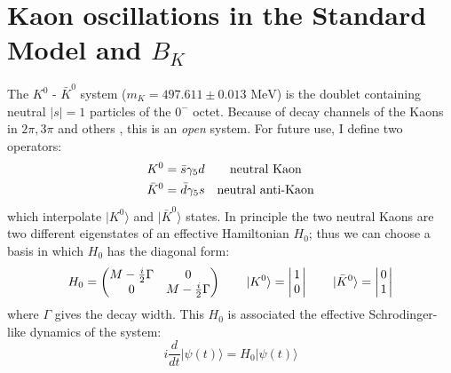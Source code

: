 \documentclass[english, LaM, oneside, noexaminfo]{sapthesis}
\newcommand{\kkb}{$K^0$ - $\bar K^0$ }
\newcommand{\ra}{\rangle}
\newcommand{\mev}{\text{ MeV}}
\begin{document}
\section{Kaon oscillations in the Standard Model and $B_K$}
\noindent
The \kkb system ($m_K = 497.611 \pm 0.013 \mev$) is the doublet containing neutral $|s| = 1$ particles of the $0^-$ octet.
Because of decay channels of the Kaons in $2\pi, 3\pi$ and others \cite{ParticleDataGroup}, this is an \textit{open} system.
For future use, I define two operators:
\begin{equation}\label{eq:kkbar-operators}
    \begin{aligned}
        & K^0 = \bar s \gamma_5 d & \text{neutral Kaon \space \space} \\
        & \bar K^0 = \bar d \gamma_5 s & \text{neutral anti-Kaon}
    \end{aligned}
\end{equation}
which interpolate $| K^0\ra$ and $|\bar K^0\ra$ states.
In principle the two neutral Kaons are two different eigenstates of an effective Hamiltonian $H_0$;
thus we can choose a basis in which $H_0$ has the diagonal form:
\begin{equation*}
    H_0 =
    \begin{pmatrix}
        M - \frac{i}{2}\Gamma & 0 \\
        0 & M - \frac{i}{2}\Gamma
    \end{pmatrix}
    \qquad | K^0 \ra = 
    \begin{vmatrix}
        \hspace*{0.5mm} 1 \hspace*{0.5mm} \\ \hspace*{0.5mm} 0 \hspace*{0.5mm}
    \end{vmatrix}
    \qquad | \bar K^0 \ra = 
    \begin{vmatrix}
        \hspace*{0.5mm} 0 \hspace*{0.5mm} \\ \hspace*{0.5mm} 1 \hspace*{0.5mm}
    \end{vmatrix}
\end{equation*}
where $\Gamma$ gives the decay width.
This $H_0$ is associated the effective Schrodinger-like dynamics of the system:
\begin{equation*}
    i\frac{d}{d t} | \psi (t) \ra = H_0 | \psi (t) \ra
\end{equation*}
\end{document}
